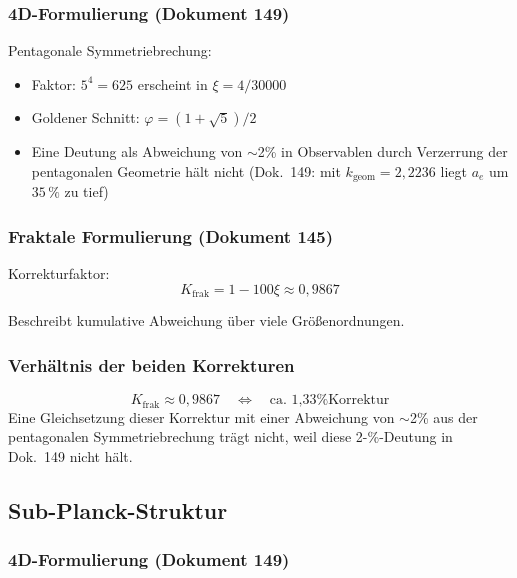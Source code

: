 	\subsubsection{4D-Formulierung (Dokument 149)}
	
	Pentagonale Symmetriebrechung:
	\begin{itemize}
		\item Faktor: $5^4 = 625$ erscheint in $\xi = 4/30000$
		\item Goldener Schnitt: $\varphi = (1+\sqrt{5})/2$
		\item Eine Deutung als Abweichung von $\sim$2\% in Observablen durch Verzerrung der pentagonalen Geometrie hält nicht (Dok.~149: mit $k_\text{geom} = 2{,}2236$ liegt $a_e$ um $35\,\%$ zu tief)
	\end{itemize}
	
	\subsubsection{Fraktale Formulierung (Dokument 145)}
	
	Korrekturfaktor:
	\begin{equation}
		K_{\text{frak}} = 1 - 100\xi \approx 0{,}9867
	\end{equation}
	
	Beschreibt kumulative Abweichung über viele Größenordnungen.
	
	\subsubsection{Verhältnis der beiden Korrekturen}
	
	\begin{equation}
		K_{\text{frak}} \approx 0{,}9867 \quad \Leftrightarrow \quad \text{ca. 1{,}33\% Korrektur}
	\end{equation}
	Eine Gleichsetzung dieser Korrektur mit einer Abweichung von $\sim$2\% aus der pentagonalen Symmetriebrechung trägt nicht, weil diese 2-\%-Deutung in Dok.~149 nicht hält.
	
	\subsection{Sub-Planck-Struktur}
	
	\subsubsection{4D-Formulierung (Dokument 149)}
	
